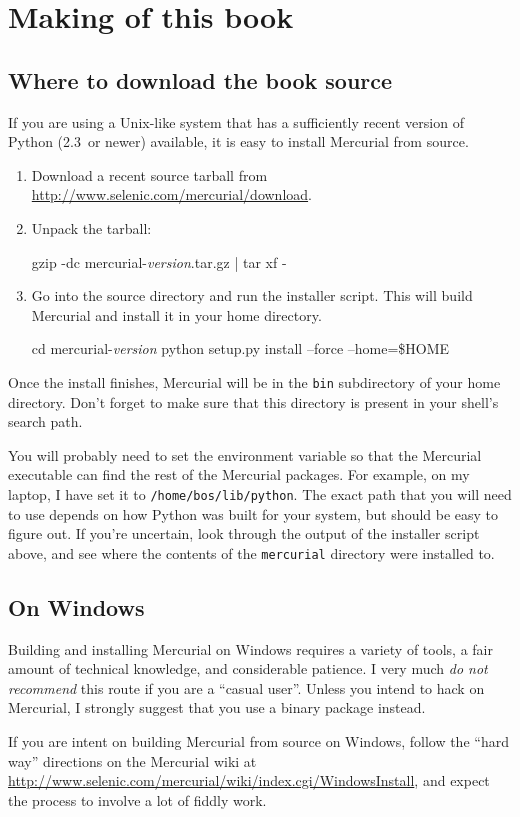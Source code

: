 \chapter{Making of this book}
\label{chap:bookmaking}

\section{Where to download the book source}
\label{sec:srcinstall:unixlike}

If you are using a Unix-like system that has a sufficiently recent
version of Python (2.3~or newer) available, it is easy to install
Mercurial from source.
\begin{enumerate}
\item Download a recent source tarball from
  \url{http://www.selenic.com/mercurial/download}.
\item Unpack the tarball:
  \begin{codesample4}
    gzip -dc mercurial-\emph{version}.tar.gz | tar xf -
  \end{codesample4}
\item Go into the source directory and run the installer script.  This
  will build Mercurial and install it in your home directory.
  \begin{codesample4}
    cd mercurial-\emph{version}
    python setup.py install --force --home=\$HOME
  \end{codesample4}
\end{enumerate}
Once the install finishes, Mercurial will be in the \texttt{bin}
subdirectory of your home directory.  Don't forget to make sure that
this directory is present in your shell's search path.

You will probably need to set the  environment
variable so that the Mercurial executable can find the rest of the
Mercurial packages.  For example, on my laptop, I have set it to
\texttt{/home/bos/lib/python}.  The exact path that you will need to
use depends on how Python was built for your system, but should be
easy to figure out.  If you're uncertain, look through the output of
the installer script above, and see where the contents of the
\texttt{mercurial} directory were installed to.

\section{On Windows}

Building and installing Mercurial on Windows requires a variety of
tools, a fair amount of technical knowledge, and considerable
patience.  I very much \emph{do not recommend} this route if you are a
``casual user''.  Unless you intend to hack on Mercurial, I strongly
suggest that you use a binary package instead.

If you are intent on building Mercurial from source on Windows, follow
the ``hard way'' directions on the Mercurial wiki at
\url{http://www.selenic.com/mercurial/wiki/index.cgi/WindowsInstall},
and expect the process to involve a lot of fiddly work.


